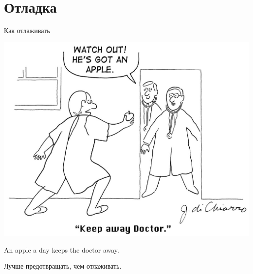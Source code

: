 \section{Отладка}

\begin{frame}
\end{frame}

\begin{frame}{Как отлаживать}
	\begin{center}
		\includegraphics[scale=0.2]{apple-a-day.jpg}
		\pause

		An apple a day keeps the doctor away.

		Лучше предотвращать, чем отлаживать.
	\end{center}
\end{frame}

